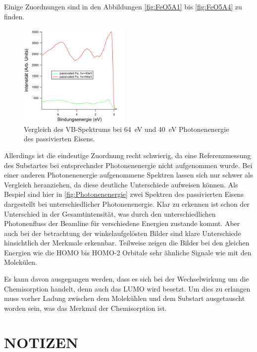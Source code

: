         Einige Zuordnungen sind in den Abbildungen \ref{fig:FeO5A1} bis \ref{fig:FeO5A4} zu finden.
        \begin{figure}
            \centering
            \includegraphics[height=5cm]{./content/pictures/pFe/Photonenenergie.png}
            \caption{Vergleich des VB-Spektrums bei \SI{64}{\electronvolt} und \SI{40}{\electronvolt} Photonenenergie des passivierten Eisens.}
            \label{fig:Photonenenergie}
        \end{figure}
        Allerdings ist die eindeutige Zuordnung recht schwierig, da eine Referenzmessung des Substartes bei entsprechnder Photonenenergie nicht aufgenommen wurde.
        Bei einer anderen Photonenenergie aufgenommene Spektren lassen sich nur schwer als Vergleich heranziehen, da diese deutliche Unterschiede aufweisen können.
        Als Bespiel sind hier in \autoref{fig:Photonenenergie} zwei Spektren des passivierten Eisens dargestellt bei unterschiedlicher Photonenenergie.
        Klar zu erkennen ist schon der Unterschied in der Gesamtintensität, was durch den unterschiedlichen Photonenfluss der Beamline für verschiedene Energien zustande kommt.
        Aber auch bei der betrachtung der winkelaufgelösten Bilder sind klare Unterschiede hinsichtlich der Merkmale erkennbar.
        Teilweise zeigen die Bilder bei den gleichen Energien wie die HOMO bis HOMO-2 Orbitale sehr ähnliche Signale wie mit den Molekülen.

        Es kann davon ausgegangen werden, dass es sich bei der Wechselwirkung um die Chemisorption handelt, denn auch das LUMO wird besetzt.
        Um dies zu erlangen muss vorher Ladung zwischen dem Molekühlen und dem Substart ausgetauscht worden sein, was das Merkmal der Chemisorption ist.

  
    \section{NOTIZEN}
